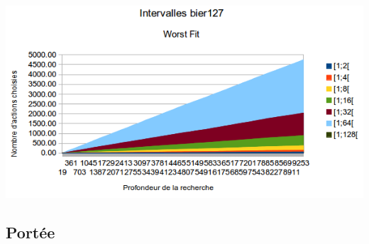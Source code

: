\documentclass[a4paper,10pt]{report}
\begin{document}
\begin{center}
  \includegraphics[width=\textwidth]{images/bier127-intervals-worst-fit.png}
\end{center}

\subsection{Portée}

\end{document}
